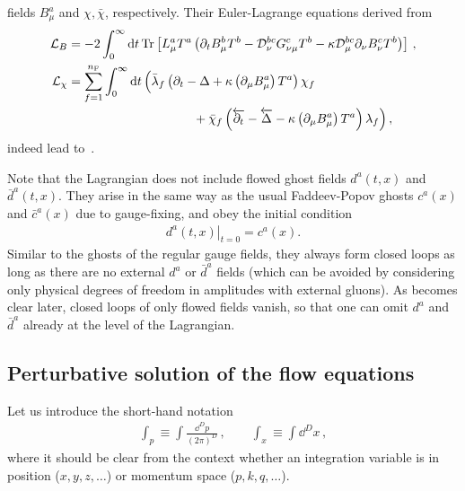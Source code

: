 fields $B_\mu^a$ and $\chi,\bar\chi$, respectively.
Their Euler-Lagrange equations derived from
\begin{equation}
  \begin{split}
  \mathcal{L}_{B} &= -2 \int_0^\infty \mathrm{d}t \, \textrm{Tr} \left[
    L_\mu^a T^a \left(\partial_t B_\mu^b T^b -\mathcal{D}_\nu^{bc}
    G_{\nu \mu}^c T^b - \kappa \mathcal{D}_\mu^{bc} \partial_\nu B_\nu^c
    T^b \right) \right]\,,\\ \mathcal{L}_{\chi} & =
  \sum_{f=1}^{\NF}\int_0^\infty \mathrm{d}t \, \Big( \bar{\lambda}_f
  \left(\partial_t - \Delta + \kappa \left(\partial_\mu B_\mu^a\right)
  T^a \right) \chi_f \\&\hspace*{10em}
  + \bar{\chi}_f \left(\overleftarrow{\partial_t} -
  \overleftarrow{\Delta} - \kappa \left(\partial_\mu B_\mu^a\right) T^a
  \right) \lambda_f \Big)\,,
  \label{eq:Lagrangian_flow}
  \end{split}
\end{equation}
indeed lead to \,\cite{Luscher:2011bx}.

Note that the Lagrangian  does not include
flowed ghost fields $d^a(t,x)$ and $\bar{d}^a(t,x)$. They arise in the
same way as the usual Faddeev-Popov ghosts $c^a(x)$ and $\bar{c}^a(x)$
due to gauge-fixing, and obey the initial condition
\begin{align}
  \left. d^a (t,x) \right|_{t=0} = c^a(x).
\end{align}
Similar to the ghosts of the regular gauge fields, they always form
closed loops as long as there are no external $d^a$ or $\bar{d}^a$
fields (which can be avoided by considering only physical degrees of
freedom in amplitudes with external gluons). As becomes clear later,
closed loops of only flowed fields vanish, so that one can omit $d^a$
and $\bar{d}^a$ already at the level of the Lagrangian.


\subsection{Perturbative solution of the flow equations}

Let us introduce the short-hand notation
\begin{equation}
  \begin{split}
    \int_p \equiv \int\frac{\dd^D p}{(2\pi)^D}\,,\qquad
    \int_x \equiv \int\dd^D x\,,
  \end{split}
\end{equation}
where it should be clear from the context whether an integration
variable is in position ($x,y,z,\ldots$) or momentum space
($p,k,q,\ldots$).

